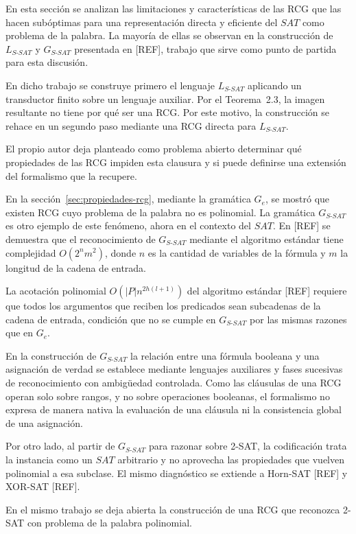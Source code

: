 \documentclass{report}
\theoremstyle{definition}
\theoremstyle{plain}
\theoremstyle{remark}
\begin{document}
En esta sección se analizan las limitaciones y características de las
RCG que las hacen subóptimas para una representación directa y
eficiente del $SAT$ como problema de la palabra. La mayoría de ellas
se observan en la construcción de $L_{S\text{-}SAT}$ y
$G_{S\text{-}SAT}$ presentada en [REF], trabajo que sirve como punto
de partida para esta discusión.

En dicho trabajo se construye primero el lenguaje $L_{S\text{-}SAT}$
aplicando un transductor finito sobre un lenguaje auxiliar. Por el
Teorema~2.3, la imagen resultante no tiene por qué ser una RCG. Por
este motivo, la construcción se rehace en un segundo paso mediante
una RCG directa para $L_{S\text{-}SAT}$.

El propio autor deja planteado como problema abierto determinar qué
propiedades de las RCG impiden esta clausura y si puede definirse una
extensión del formalismo que la recupere.

En la sección~\ref{sec:propiedades-rcg}, mediante la gramática $G_e$,
se mostró que existen RCG cuyo problema de la palabra no es
polinomial. La gramática $G_{S\text{-}SAT}$ es otro ejemplo de este
fenómeno, ahora en el contexto del $SAT$. En [REF] se demuestra que
el reconocimiento de $G_{S\text{-}SAT}$ mediante el algoritmo estándar
tiene complejidad $O(2^n m^2)$, donde $n$ es la cantidad de variables
de la fórmula y $m$ la longitud de la cadena de entrada.

La acotación polinomial $O(|P| n^{2h(l+1)})$ del algoritmo estándar
[REF] requiere que todos los argumentos que reciben los predicados
sean subcadenas de la cadena de entrada, condición que no se cumple
en $G_{S\text{-}SAT}$ por las mismas razones que en $G_e$.

En la construcción de $G_{S\text{-}SAT}$ la relación entre una fórmula
booleana y una asignación de verdad se establece mediante lenguajes
auxiliares y fases sucesivas de reconocimiento con ambigüedad
controlada. Como las cláusulas de una RCG operan solo sobre rangos, y
no sobre operaciones booleanas, el formalismo no expresa de manera
nativa la evaluación de una cláusula ni la consistencia global de una
asignación.

Por otro lado, al partir de $G_{S\text{-}SAT}$ para razonar sobre
2-SAT, la codificación trata la instancia como un $SAT$ arbitrario y
no aprovecha las propiedades que vuelven polinomial a esa subclase. El
mismo diagnóstico se extiende a Horn-SAT [REF] y XOR-SAT [REF].

En el mismo trabajo se deja abierta la construcción de una RCG que
reconozca 2-SAT con problema de la palabra polinomial.
\end{document}
